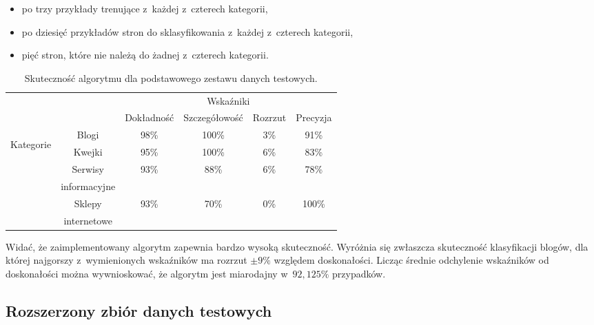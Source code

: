 \documentclass[a4paper,11pt]{article}
\begin{document}
\begin{itemize}
    \item po trzy przykłady trenujące z~każdej z~czterech kategorii,
    \item po dziesięć przykładów stron do sklasyfikowania z~każdej z~czterech kategorii,
    \item pięć stron, które nie należą do żadnej z~czterech kategorii.
\end{itemize}

\begin{table}[ht!]
\centering
    \begin{tabular}{| c | c | c | c | c | c |}
        \hline
        \multicolumn{2}{|c|}{} & \multicolumn{4}{c|}{Wskaźniki} \\
        \cline{3-6}
        \multicolumn{2}{|c|}{} & Dokładność & Szczegółowość & Rozrzut & Precyzja \\
        \hline
        \multirow{6}{*}{\begin{sideways}Kategorie \end{sideways}} & Blogi & 98\% & 100\% & 3\% & 91\% \\
        \cline{2-6}
        & Kwejki & 95\% & 100\% & 6\% & 83\% \\
        \cline{2-6}
        & Serwisy & \multirow{2}{*}{93\%} & \multirow{2}{*}{88\%} & \multirow{2}{*}{6\%} & \multirow{2}{*}{78\%} \\
        & informacyjne & & & & \\
        \cline{2-6}
        & Sklepy & \multirow{2}{*}{93\%} & \multirow{2}{*}{70\%} & \multirow{2}{*}{0\%} & \multirow{2}{*}{100\%} \\
        & internetowe & & & & \\
        \hline
    \end{tabular}
    \caption{Skuteczność algorytmu dla podstawowego zestawu danych testowych.}
    \label{tab:reduced_set_accuracy}
\end{table}

Widać, że zaimplementowany algorytm zapewnia bardzo wysoką skuteczność. Wyróżnia się zwłaszcza skuteczność klasyfikacji blogów, dla której najgorszy z~wymienionych wskaźników ma rozrzut $\pm 9\%$ względem doskonałości. Licząc średnie odchylenie wskaźników od doskonałości można wywnioskować, że  algorytm jest miarodajny w~$92,125\%$ przypadków.

\subsection{Rozszerzony zbiór danych testowych}
\end{document}
